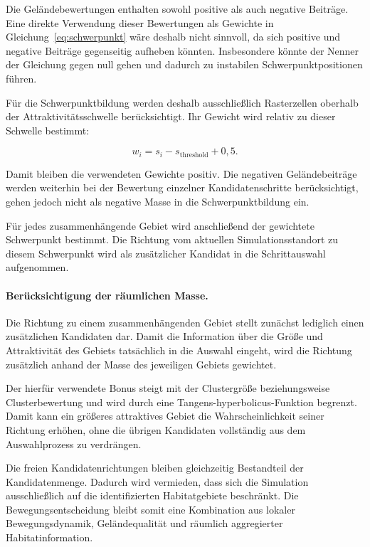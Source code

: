 \documentclass[12pt,a4paper]{report}
\begin{document}
Die Geländebewertungen enthalten sowohl positive als auch negative Beiträge.
Eine direkte Verwendung dieser Bewertungen als Gewichte in
Gleichung~\eqref{eq:schwerpunkt} wäre deshalb nicht sinnvoll, da sich positive
und negative Beiträge gegenseitig aufheben könnten. Insbesondere könnte der
Nenner der Gleichung gegen null gehen und dadurch zu instabilen
Schwerpunktpositionen führen.

Für die Schwerpunktbildung werden deshalb ausschließlich Rasterzellen
oberhalb der Attraktivitätsschwelle berücksichtigt. Ihr Gewicht wird relativ
zu dieser Schwelle bestimmt:

\begin{equation}
w_i =
s_i-s_{\mathrm{threshold}}+0{,}5.
\label{eq:cluster_weight}
\end{equation}

Damit bleiben die verwendeten Gewichte positiv. Die negativen Geländebeiträge
werden weiterhin bei der Bewertung einzelner Kandidatenschritte berücksichtigt,
gehen jedoch nicht als negative Masse in die Schwerpunktbildung ein.

Für jedes zusammenhängende Gebiet wird anschließend der gewichtete Schwerpunkt
bestimmt. Die Richtung vom aktuellen Simulationsstandort zu diesem Schwerpunkt
wird als zusätzlicher Kandidat in die Schrittauswahl aufgenommen.

\paragraph{Berücksichtigung der räumlichen Masse.}

Die Richtung zu einem zusammenhängenden Gebiet stellt zunächst lediglich einen
zusätzlichen Kandidaten dar. Damit die Information über die Größe und
Attraktivität des Gebiets tatsächlich in die Auswahl eingeht, wird die
Richtung zusätzlich anhand der Masse des jeweiligen Gebiets gewichtet.

Der hierfür verwendete Bonus steigt mit der Clustergröße beziehungsweise
Clusterbewertung und wird durch eine Tangens-hyperbolicus-Funktion begrenzt.
Damit kann ein größeres attraktives Gebiet die Wahrscheinlichkeit seiner
Richtung erhöhen, ohne die übrigen Kandidaten vollständig aus dem
Auswahlprozess zu verdrängen.

Die freien Kandidatenrichtungen bleiben gleichzeitig Bestandteil der
Kandidatenmenge. Dadurch wird vermieden, dass sich die Simulation ausschließlich
auf die identifizierten Habitatgebiete beschränkt. Die Bewegungsentscheidung
bleibt somit eine Kombination aus lokaler Bewegungsdynamik, Geländequalität und
räumlich aggregierter Habitatinformation.
\end{document}
